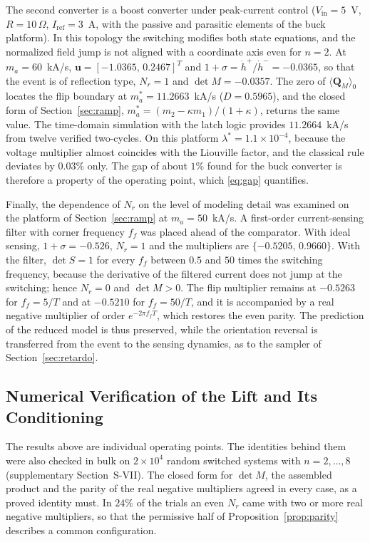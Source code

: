 \documentclass[journal]{IEEEtran}
\begin{document}
The second converter is a boost converter under peak-current control
($V_{\mathrm{in}}=5$~V, $R=10\,\Omega$, $I_{\mathrm{ref}}=3$~A, with the
passive and parasitic elements of the buck platform). In this topology the
switching modifies both state equations, and the normalized field jump is
not aligned with a coordinate axis even for $n=2$. At $m_a=60$~kA/s,
$\bm{u}=[-1.0365,\,0.2467]^{T}$ and
$1+\sigma=\dot h^{+}/\dot h^{-}=-0.0365$, so that the event is of reflection
type, $N_r=1$ and $\det M=-0.0357$. The zero of $\langle\bm{Q}_M\rangle_0$
locates the flip boundary at $m_a^{*}=11.2663$~kA/s ($D=0.5965$), and the
closed form of Section~\ref{sec:ramp}, $m_a^{*}=(m_2-\kappa m_1)/(1+\kappa)$,
returns the same value. The time-domain simulation with the latch logic
provides $11.2664$~kA/s from twelve verified two-cycles. On this platform
$\lambda^{*}=1.1\times10^{-4}$, because the voltage multiplier almost
coincides with the Liouville factor, and the classical rule deviates by
$0.03\%$ only. The gap of about $1\%$ found for the buck converter is
therefore a property of the operating point, which \eqref{eq:gap}
quantifies.

Finally, the dependence of $N_r$ on the level of modeling detail was
examined on the platform of Section~\ref{sec:ramp} at $m_a=50$~kA/s. A
first-order current-sensing filter with corner frequency $f_f$ was placed
ahead of the comparator. With ideal sensing,
$1+\sigma=-0.526$, $N_r=1$ and the multipliers are $\{-0.5205,\,0.9660\}$.
With the filter, $\det S=1$ for every $f_f$ between $0.5$ and $50$ times the
switching frequency, because the derivative of the filtered current does not
jump at the switching; hence $N_r=0$ and $\det M>0$. The flip multiplier
remains at $-0.5263$ for $f_f=5/T$ and at $-0.5210$ for $f_f=50/T$, and it is
accompanied by a real negative multiplier of order $e^{-2\pi f_fT}$, which
restores the even parity. The prediction of the reduced model is thus
preserved, while the orientation reversal is transferred from the event to
the sensing dynamics, as to the sampler of Section~\ref{sec:retardo}.

\subsection{Numerical Verification of the Lift and Its Conditioning}
\label{sec:campana}
The results above are individual operating points. The identities behind
them were also checked in bulk on $2\times10^{4}$ random switched systems
with $n=2,\dots,8$ (supplementary Section~S-VII). The closed form for
$\det M$, the assembled product and the parity of the real negative
multipliers agreed in every case, as a proved identity must. In $24\%$ of
the trials an even $N_r$ came with two or more real negative multipliers, so
that the permissive half of Proposition~\ref{prop:parity} describes a common
configuration.
\end{document}
